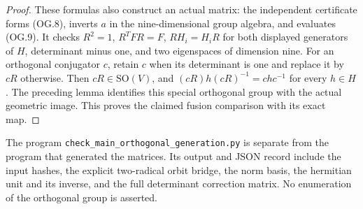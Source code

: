\begin{proof}
These formulas also construct an actual
matrix: the independent certificate forms
(OG.8), inverts \(a\) in the nine-dimensional
group algebra, and evaluates (OG.9).
It checks \(R^2=1\), \(R^TFR=F\),
\(RH_i=H_iR\) for both displayed generators
of \(H\), determinant minus one, and
two eigenspaces of dimension nine.
For an orthogonal conjugator \(c\), retain
\(c\) when its determinant is one and
replace it by \(cR\) otherwise.
Then \(cR\in\mathrm{SO}(V)\), and
\((cR)h(cR)^{-1}=chc^{-1}\) for every
\(h\in H\). The preceding lemma identifies
this special orthogonal group with the
actual geometric image. This proves the
claimed fusion comparison with its exact map.
\end{proof}

The program \texttt{check\_main\_orthogonal\_generation.py}
is separate from the program that generated the
matrices. Its output and JSON record include
the input hashes, the explicit two-radical
orbit bridge, the norm basis, the hermitian
unit and its inverse, and the full determinant
correction matrix. No enumeration of the
orthogonal group is asserted.
